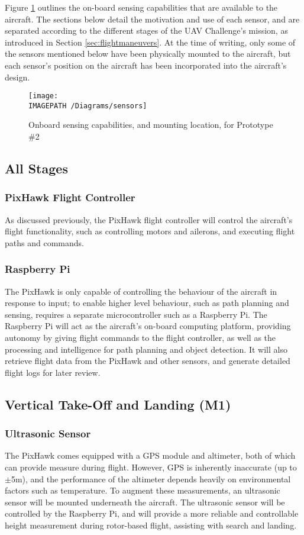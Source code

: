 \label{sec:sensing}
Figure \ref{fig:sensing} outlines the on-board sensing capabilities that are available to the aircraft. The sections below detail the motivation and use of each sensor, and are separated according to the different stages of the UAV Challenge's mission, as introduced in Section \ref{sec:flightmaneuvers}. At the time of writing, only some of the sensors mentioned below have been physically mounted to the aircraft, but each sensor's position on the aircraft has been incorporated into the aircraft's design.

\begin{figure}[!ht]
	\centering
	\texttt{[image: \\IMAGEPATH /Diagrams/sensors]}
	\caption{Onboard sensing capabilities, and mounting location, for Prototype \#2}
	\label{fig:sensing}
\end{figure}

\subsection{All Stages}

\subsubsection*{PixHawk Flight Controller}
As discussed previously, the PixHawk flight controller will control the aircraft's flight functionality, such as controlling motors and ailerons, and executing flight paths and commands.

\subsubsection*{Raspberry Pi}
The PixHawk is only capable of controlling the behaviour of the aircraft in response to input; to enable higher level behaviour, such as path planning and sensing, requires a separate microcontroller such as a Raspberry Pi. The Raspberry Pi will act as the aircraft's on-board computing platform, providing autonomy by giving flight commands to the flight controller, as well as the processing and intelligence for path planning and object detection. It will also retrieve flight data from the PixHawk and other sensors, and generate detailed flight logs for later review.

\subsection{Vertical Take-Off and Landing (M1)}
\subsubsection*{Ultrasonic Sensor}
The PixHawk comes equipped with a GPS module and altimeter, both of which can provide measure during flight. However, GPS is inherently inaccurate (up to $\pm$5m), and the performance of the altimeter depends heavily on environmental factors such as temperature. To augment these measurements, an ultrasonic sensor will be mounted underneath the aircraft. The ultrasonic sensor will be controlled by the Raspberry Pi, and will provide a more reliable and controllable height measurement during rotor-based flight, assisting with search and landing.

